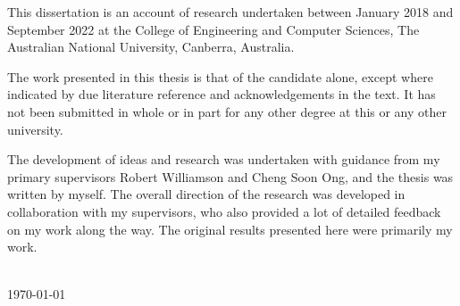 \begin{declaration}
\begingroup
\large
\noindent This dissertation is an account of research undertaken between January 2018 and September 2022 at the College of Engineering and Computer Sciences, The Australian National University, Canberra, Australia. 


The work presented in this thesis is that of the candidate alone, except where indicated by due literature reference and acknowledgements in the text. It has not been submitted in whole or in part for any other degree at this or any other university.

The development of ideas and research was undertaken with guidance from my primary supervisors Robert Williamson and Cheng Soon Ong, and the thesis was written by myself. The overall direction of the research was developed in collaboration with my supervisors, who also provided a lot of detailed feedback on my work along the way. The original results presented here were primarily my work.

\bigskip
\vspace{1cm}
\begin{flushright}
\authorname\\
\today
\end{flushright}
\endgroup
\end{declaration}
\vspace{3cm}
\cleardoublepage


